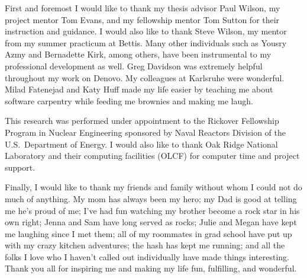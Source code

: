 \begin{acknowledgments}
First and foremost I would like to thank my thesis advisor Paul Wilson, my project mentor Tom Evans, and my fellowship mentor Tom Sutton for their instruction and guidance. I would also like to thank Steve Wilson, my mentor from my summer practicum at Bettis. Many other individuals such as Yousry Azmy and Bernadette Kirk, among others, have been instrumental to my professional development as well. Greg Davidson was extremely helpful throughout my work on Denovo. My colleagues at Karlsruhe were wonderful. Milad Fatenejad and Katy Huff made my life easier by teaching me about software carpentry while feeding me brownies and making me laugh. 

This research was performed under appointment to the Rickover Fellowship Program in Nuclear Engineering sponsored by Naval Reactors Division of the U.S.\ Department of Energy. I would also like to thank Oak Ridge National Laboratory and their computing facilities (OLCF) for computer time and project support. 

Finally, I would like to thank my friends and family without whom I could not do much of anything. My mom has always been my hero; my Dad is good at telling me he's proud of me; I've had fun watching my brother become a rock star in his own right; Jenna and Sam have long served as rocks; Julie and Megan have kept me laughing since I met them; all of my roommates in grad school have put up with my crazy kitchen adventures; the hash has kept me running; and all the folks I love who I haven't called out individually have made things interesting. Thank you all for inspiring me and making my life fun, fulfilling, and wonderful.

\end{acknowledgments}

\tableofcontents
\listoftables
\listoffigures


